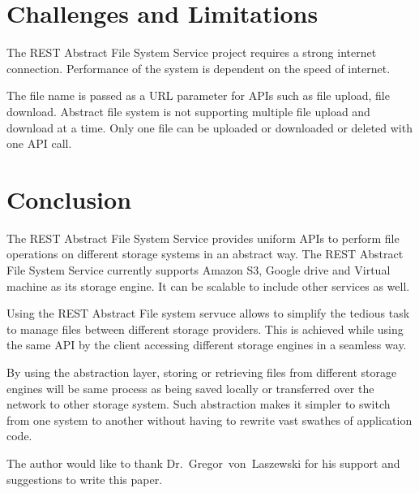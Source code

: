 \section{Challenges and Limitations}

The REST Abstract File System Service project requires a strong
internet connection.  Performance of the system is dependent on the
speed of internet.

The file name is passed as a URL parameter for APIs such as file upload,
file download. Abstract file system is not supporting multiple file 
upload and download at a time. Only one file can be uploaded or 
downloaded or deleted with one API call. 


\section{Conclusion}

The REST Abstract File System Service provides uniform APIs to perform
file operations on different storage systems in an abstract way. The
REST Abstract File System Service currently supports Amazon S3, Google
drive and Virtual machine as its storage engine. It can be scalable to
include other services as well.


Using the REST Abstract File system servuce allows to simplify the
tedious task to manage files between different storage providers. This
is achieved while using the same API by the client accessing different
storage engines in a seamless way.


By using the abstraction layer, storing or retrieving files from
different storage engines will be same process as being saved locally
or transferred over the network to other storage system. Such
abstraction makes it simpler to switch from one system to another
without having to rewrite vast swathes of application code.



\begin{acks}

  The author would like to thank Dr.~Gregor~von~Laszewski for his
  support and suggestions to write this paper.

\end{acks}


 

